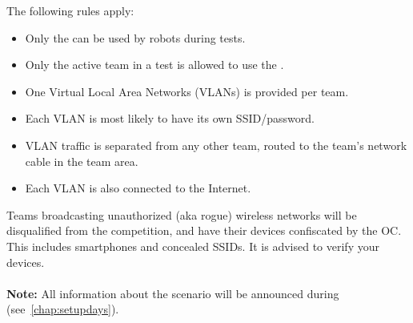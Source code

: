 The following rules apply:

\begin{itemize}
	\item Only the \ArenaNetwork{} can be used by robots during tests.
	\item Only the active team in a test is allowed to use the \ArenaNetwork{}.
	\item One Virtual Local Area Networks (VLANs) is provided per team.
	\item Each VLAN is most likely to have its own SSID/password.
	\item VLAN traffic is separated from any other team, routed to the team's network cable in the team area.
	\item Each VLAN is also connected to the Internet.
\end{itemize}

\noindent Teams broadcasting unauthorized (aka rogue) wireless networks will be disqualified from the competition, and have their devices confiscated by the OC. This includes smartphones and concealed SSIDs. It is advised to verify your devices.
\\ \\
\textbf{Note:} All information about the scenario will be announced during \SetupDays{} (see~\ref{chap:setupdays}).

